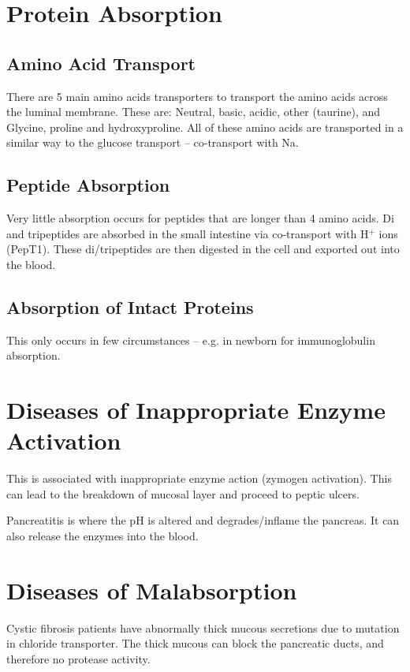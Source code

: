 \documentclass[a4paper, 12pt]{report}
\begin{document}
\section{Protein Absorption}

\subsection{Amino Acid Transport}

There are 5 main amino acids transporters to transport the amino acids across the luminal membrane.
These are: Neutral, basic, acidic, other (taurine), and Glycine, proline and hydroxyproline.
All of these amino acids are transported in a similar way to the glucose transport -- co-transport with Na.

\subsection{Peptide Absorption}

Very little absorption occurs for peptides that are longer than 4 amino acids.
Di and tripeptides are absorbed in the small intestine via co-transport with H$^+$ ions (PepT1).
These di/tripeptides are then digested in the cell and exported out into the blood.

\subsection{Absorption of Intact Proteins}

This only occurs in few circumstances -- e.g. in newborn for immunoglobulin absorption.

\section{Diseases of Inappropriate Enzyme Activation}

This is associated with inappropriate enzyme action (zymogen activation).
This can lead to the breakdown of mucosal layer and proceed to peptic ulcers.

Pancreatitis is where the pH is altered and degrades/inflame the pancreas.
It can also release the enzymes into the blood.

\section{Diseases of Malabsorption}

Cystic fibrosis patients have abnormally thick mucous secretions due to mutation in chloride transporter.
The thick mucous can block the pancreatic ducts, and therefore no protease activity.
\end{document}
